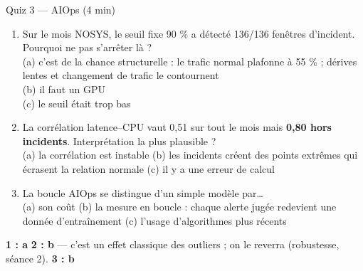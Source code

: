 \begin{frame}{Quiz 3 --- AIOps (4 min)}
\footnotesize%
\begin{qbox}[3 questions]
\begin{enumerate}
\item Sur le mois NOSYS, le seuil fixe 90 \% a détecté 136/136 fenêtres d'incident.
Pourquoi ne pas s'arrêter là ?\\
(a) c'est de la chance structurelle : le trafic normal plafonne à 55 \% ;
dérives lentes et changement de trafic le contournent\\
(b) il faut un GPU\\ (c) le seuil était trop bas
\item La corrélation latence--CPU vaut 0,51 sur tout le mois mais
\textbf{0,80 hors incidents}. Interprétation la plus plausible ?\\
(a) la corrélation est instable \quad (b) les incidents créent des points
extrêmes qui écrasent la relation normale \quad (c) il y a une erreur de calcul
\item La boucle AIOps se distingue d'un simple modèle par\ldots\\
(a) son coût \quad (b) la mesure en boucle : chaque alerte jugée redevient
une donnée d'entraînement \quad (c) l'usage d'algorithmes plus récents
\end{enumerate}
\end{qbox}
\vspace{1mm}
\begin{solbox}[Réponses]
\textbf{1 : a} \quad \textbf{2 : b} --- c'est un effet classique des outliers ;
on le reverra (robustesse, séance 2). \quad \textbf{3 : b}
\end{solbox}
\end{frame}
